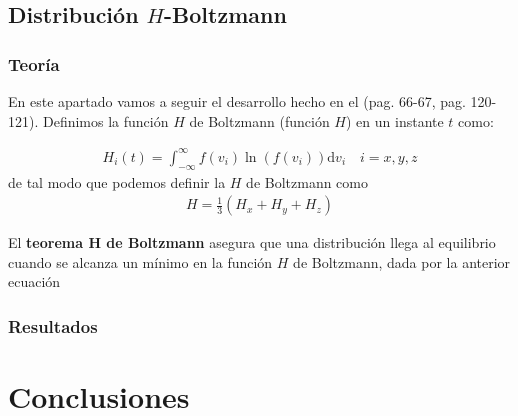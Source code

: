 \documentclass[11pt]{article} %
\newcommand{\parentesis}[1]{\left( #1  \right)}
\newcommand{\D}{\mathrm{d}}
\begin{document}
	
\subsection{Distribución $H$-Boltzmann} 	
\subsubsection{Teoría}

En este apartado vamos a seguir el desarrollo hecho en el \cite{Haile} (pag. 66-67, pag. 120-121). Definimos la función $H$ de Boltzmann (función $H$) en un instante $t$ como:

\begin{eqnarray}
	H_i(t) = \int_{-\infty}^{\infty} f(v_i) \ln (f(v_i)) \D v_i \quad i = x,y,z
\end{eqnarray} 
de tal modo que podemos definir la $H$ de Boltzmann como
\begin{eqnarray}
	H=\frac{1}{3} \parentesis{H_x+H_y+H_z}
\end{eqnarray}

El \textbf{teorema H de Boltzmann} asegura que una distribución llega al equilibrio cuando se alcanza un mínimo en la función $H$ de Boltzmann, dada por la anterior ecuación

\subsubsection{Resultados}
	
\section{Conclusiones}
	
	


	
	
\end{document}
